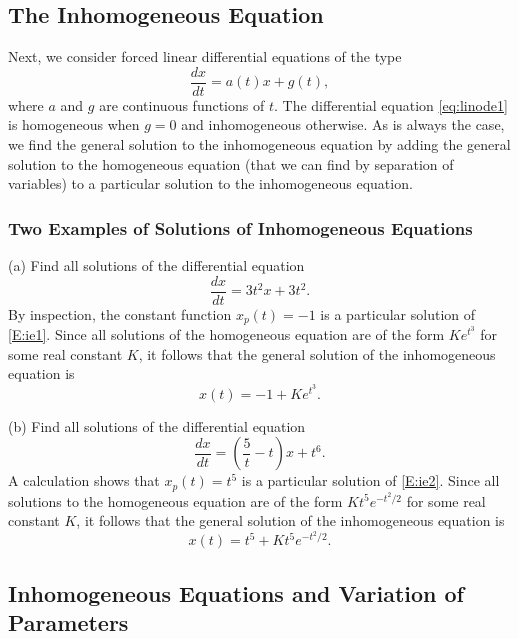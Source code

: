 \documentclass{ximera}
\begin{document}
\subsection*{The Inhomogeneous Equation}

Next, we consider forced linear differential equations of the type
\begin{equation}   \label{eq:linode1}
\frac{dx}{dt} = a(t)x + g(t),
\end{equation}
where $a$ and $g$ are continuous functions of $t$.  The differential  
equation \eqref{eq:linode1} is homogeneous when $g=0$  and 
 inhomogeneous otherwise.  As is always the 
case, we find the general solution 
to the inhomogeneous equation 
by adding the general solution to the homogeneous equation (that
we can find by separation of variables) to a particular solution to 
the inhomogeneous equation.  

\subsubsection*{Two Examples of Solutions of Inhomogeneous Equations}

(a) Find all solutions of the differential equation
\begin{equation} \label{E:ie1}
\frac{dx}{dt} = 3t^2x + 3t^2.
\end{equation}
By inspection, the constant function $x_p(t)=-1$ is a 
particular solution 
of \eqref{E:ie1}. 
Since all solutions of the homogeneous equation are of the form $Ke^{t^3}$
for some real constant $K$, it follows that the general solution of the 
inhomogeneous equation is
\[
x(t) = -1 + Ke^{t^3}.
\]

\noindent (b) Find all solutions of the differential equation
\begin{equation}  \label{E:ie2}
\frac{dx}{dt} = \left(\frac{5}{t}-t\right) x + t^6.
\end{equation}
A calculation shows that $x_p(t)=t^5$ is a particular solution of \eqref{E:ie2}. 
Since all solutions to the homogeneous equation are of the form 
$Kt^5 e^{-t^2/2}$ for some real constant $K$, it follows that the general
solution of the inhomogeneous equation is
\[
x(t) = t^5 + Kt^5 e^{-t^2/2}.
\]

\subsection*{Inhomogeneous Equations and Variation of Parameters}
\end{document}
